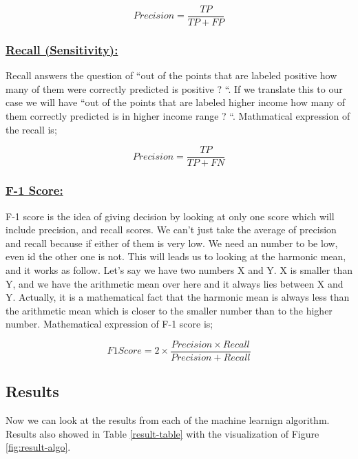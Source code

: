 \documentclass[sigconf]{acmart}
\begin{document}
\begin{equation}
Precision = \frac{TP} {TP + FP}
\end{equation}

\subsubsection{\textbf{\underline{Recall (Sensitivity):}}}

Recall answers the question of ``out of the points that are labeled positive how many of them were correctly predicted is positive ? ``. If we translate this to our case we will have ``out of the points that are labeled higher income how many of them correctly predicted is in higher income range ? ``. Mathmatical expression of the recall is; 

\begin{equation}
Precision = \frac{TP} {TP + FN}
\end{equation}

\subsubsection{\textbf{\underline{F-1 Score:}}}

F-1 score is the idea of giving decision by looking at only one score which will include  precision, and recall scores. We can't just take the average of precision and recall because if either of them is very low. We need an number to be low, even id the other one is not. This will leads us to looking at the harmonic mean, and it works as follow. Let's say we have two numbers X and Y. X is smaller than Y, and we have the arithmetic mean over here and it always lies between X and Y. Actually, it is a mathematical fact that the harmonic mean is always less than the arithmetic mean which is closer to the smaller number than to the higher number. Mathematical expression of F-1 score is; 

\begin{equation}
F1 Score = 2 \times {\frac{Precision \times Recall} {Precision + Recall}}
\end{equation}

\subsection{Results}
Now we can look at the results from each of the machine learnign algorithm. Results also showed in Table \ref{result-table} with the visualization of Figure \ref{fig:result-algo}.
\end{document}
